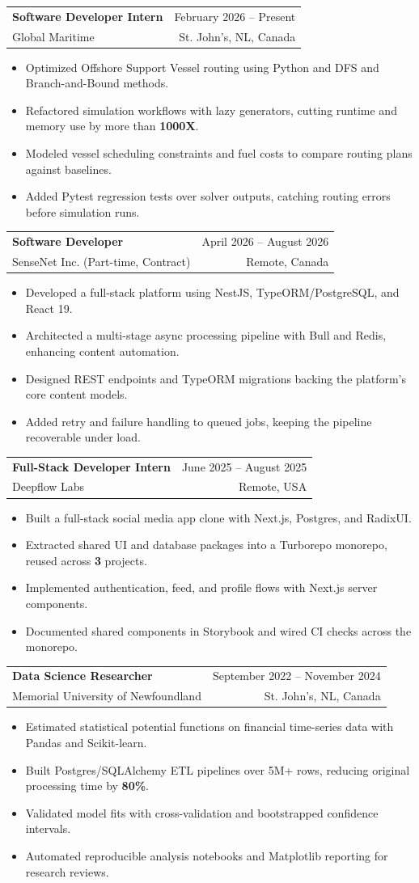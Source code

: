 \documentclass[letterpaper,11pt]{article}
\makeatletter
\newcommand{\resumeItem}[1]{
  \item\small{
    {#1 \vspace{-2pt}}
  }
}
\newcommand{\resumeSubheading}[4]{
  \vspace{-2pt}\item
    \begin{tabular*}{0.97\textwidth}[t]{l@{\extracolsep{\fill}}r}
      \textbf{#1} & {\small #2} \\
      {\small#3} & {\small #4} \\
    \end{tabular*}\vspace{-7pt}
}
\newcommand{\resumeItemListStart}{\begin{itemize}}
\newcommand{\resumeItemListEnd}{\end{itemize}\vspace{-2pt}}
\makeatother
\begin{document}
    \resumeSubheading
      {Software Developer Intern}{February 2026 -- Present}
      {Global Maritime}{St. John's, NL, Canada}
      \vspace{0.5pt}
      \resumeItemListStart
        \resumeItem{Optimized Offshore Support Vessel routing using Python and DFS and Branch-and-Bound methods.}
        \resumeItem{Refactored simulation workflows with lazy generators, cutting runtime and memory use by more than \textbf{1000X}.}
        \resumeItem{Modeled vessel scheduling constraints and fuel costs to compare routing plans against baselines.}
        \resumeItem{Added Pytest regression tests over solver outputs, catching routing errors before simulation runs.}
      \resumeItemListEnd

        \resumeSubheading
      {Software Developer}{April 2026 -- August 2026}
      {SenseNet Inc. (Part-time, Contract)}{Remote, Canada}
      \vspace{0.5pt}
      \resumeItemListStart
        \resumeItem{Developed a full-stack platform using NestJS, TypeORM/PostgreSQL, and React 19.}
        \resumeItem{Architected a multi-stage async processing pipeline with Bull and Redis, enhancing content automation.}
        \resumeItem{Designed REST endpoints and TypeORM migrations backing the platform's core content models.}
        \resumeItem{Added retry and failure handling to queued jobs, keeping the pipeline recoverable under load.}
      \resumeItemListEnd

    \resumeSubheading
      {Full-Stack Developer Intern}{June 2025 -- August 2025}
      {Deepflow Labs}{Remote, USA}
      \vspace{0.5pt}
      \resumeItemListStart
        \resumeItem{Built a full-stack social media app clone with Next.js, Postgres, and RadixUI.}
        \resumeItem{Extracted shared UI and database packages into a Turborepo monorepo, reused across \textbf{3} projects.}
        \resumeItem{Implemented authentication, feed, and profile flows with Next.js server components.}
        \resumeItem{Documented shared components in Storybook and wired CI checks across the monorepo.}
      \resumeItemListEnd

    \resumeSubheading
      {Data Science Researcher}{September 2022 -- November 2024}
      {Memorial University of Newfoundland}{St. John's, NL, Canada}
      \vspace{0.5pt}
      \resumeItemListStart
        \resumeItem{Estimated statistical potential functions on financial time-series data with Pandas and Scikit-learn.}
        \resumeItem{Built Postgres/SQLAlchemy ETL pipelines over 5M+ rows, reducing original processing time by \textbf{80\%}.}
        \resumeItem{Validated model fits with cross-validation and bootstrapped confidence intervals.}
        \resumeItem{Automated reproducible analysis notebooks and Matplotlib reporting for research reviews.}
      \resumeItemListEnd
\end{document}
